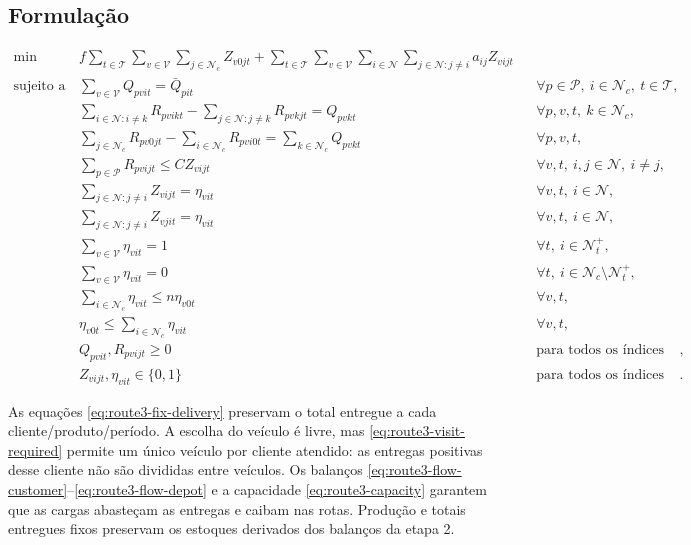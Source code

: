 \documentclass[11pt,a4paper]{article}
\newcommand{\N}{\mathcal{N}}
\newcommand{\Pset}{\mathcal{P}}
\newcommand{\Tset}{\mathcal{T}}
\newcommand{\Vset}{\mathcal{V}}
\begin{document}
\subsection{Formulação}

\begin{align}
 \min\quad
 & f\sum_{t\in\Tset}\sum_{v\in\Vset}\sum_{j\in\N_c} Z_{v0jt}
 +\sum_{t\in\Tset}\sum_{v\in\Vset}\sum_{i\in\N}\sum_{j\in\N:j\ne i} a_{ij}Z_{vijt}
 \label{eq:route3-obj}\\
 \text{sujeito a}\quad
 & \sum_{v\in\Vset}Q_{pvit}=\bar Q_{pit}
 && \forall p\in\Pset,\ i\in\N_c,\ t\in\Tset,
 \label{eq:route3-fix-delivery}\\
 & \sum_{i\in\N:i\ne k}R_{pvikt}-\sum_{j\in\N:j\ne k}R_{pvkjt}=Q_{pvkt}
 && \forall p,v,t,\ k\in\N_c,
 \label{eq:route3-flow-customer}\\
 & \sum_{j\in\N_c}R_{pv0jt}-\sum_{i\in\N_c}R_{pvi0t}
 =\sum_{k\in\N_c}Q_{pvkt}
 && \forall p,v,t,
 \label{eq:route3-flow-depot}\\
 & \sum_{p\in\Pset}R_{pvijt}\le C Z_{vijt}
 && \forall v,t,\ i,j\in\N,\ i\ne j,
 \label{eq:route3-capacity}\\
 & \sum_{j\in\N:j\ne i}Z_{vijt}=\eta_{vit}
 && \forall v,t,\ i\in\N,
 \label{eq:route3-out-degree}\\
 & \sum_{j\in\N:j\ne i}Z_{vjit}=\eta_{vit}
 && \forall v,t,\ i\in\N,
 \label{eq:route3-in-degree}\\
 & \sum_{v\in\Vset}\eta_{vit}=1
 && \forall t,\ i\in\N_t^+,
 \label{eq:route3-visit-required}\\
 & \sum_{v\in\Vset}\eta_{vit}=0
 && \forall t,\ i\in\N_c\setminus\N_t^+,
 \label{eq:route3-no-unneeded-visit}\\
 & \sum_{i\in\N_c}\eta_{vit}\le n\eta_{v0t}
 && \forall v,t,
 \label{eq:route3-route-active-upper}\\
 & \eta_{v0t}\le\sum_{i\in\N_c}\eta_{vit}
 && \forall v,t,
 \label{eq:route3-route-active-lower}\\
 & Q_{pvit},R_{pvijt}\ge0
 && \text{para todos os índices válidos},
 \label{eq:route3-continuous-dom}\\
 & Z_{vijt},\eta_{vit}\in\{0,1\}
 && \text{para todos os índices válidos}.
 \label{eq:route3-binary-dom}
\end{align}

As equações \eqref{eq:route3-fix-delivery} preservam o total entregue a cada cliente/produto/período. A escolha do veículo é livre, mas \eqref{eq:route3-visit-required} permite um único veículo por cliente atendido: as entregas positivas desse cliente não são divididas entre veículos. Os balanços \eqref{eq:route3-flow-customer}--\eqref{eq:route3-flow-depot} e a capacidade \eqref{eq:route3-capacity} garantem que as cargas abasteçam as entregas e caibam nas rotas. Produção e totais entregues fixos preservam os estoques derivados dos balanços da etapa 2.
\end{document}
